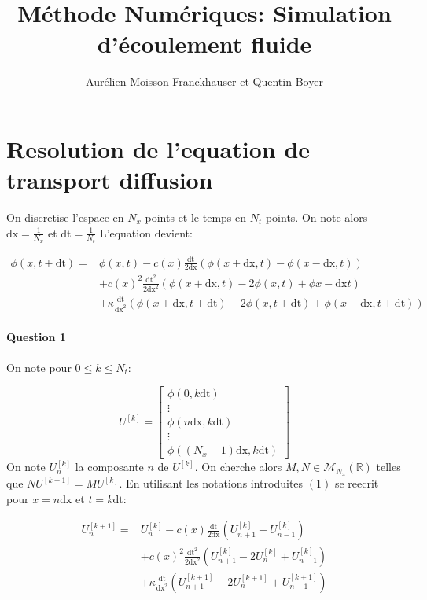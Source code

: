 \documentclass{article}
\newcommand{\dx}{\mathrm{dx}}
\newcommand{\dt}{\mathrm{dt}}
\begin{document}
\title{Méthode Numériques: Simulation d'écoulement fluide}
\author{Aurélien Moisson-Franckhauser et Quentin Boyer}
\maketitle

\section{Resolution de l'equation de transport diffusion}

On discretise l'espace en $N_x$ points et le temps en $N_t$ points. On note alors $\mathrm{dx}=\frac{1}{N_x}$ et $\mathrm{dt}=\frac{1}{N_t}$
L'equation devient:


\begin{equation}
	\begin{aligned}
	\phi(x,t+\dt) ={} & \phi(x,t)-c(x)\frac{\dt}{2\dx}(\phi(x+\dx, t)-\phi(x-\dx,t)) \\
					&+c{(x)}^2\frac{\dt^{2}}{2\dx^{2}}(\phi(x+\dx,t)-2\phi(x, t)+\phi{x-\dx}{t}) \\
					&+\kappa\frac{\dt}{\dx^2}(\phi(x+\dx,t+\dt)-2\phi(x,t+\dt)+\phi(x-\dx,t+\dt))
	\end{aligned}
\end{equation}


\paragraph{Question 1}
On note pour $0 \leq k \le N_t$:

\[U^{[k]}=
\begin{bmatrix}
	\phi(0, k\dt) \\
	\vdots \\
	\phi(n\dx, k\dt) \\
	\vdots \\
	\phi((N_x-1)\dx, k\dt)
\end{bmatrix}
\]
On note $U_n^{[k]}$ la composante $n$ de $U^{[k]}$. On cherche alors $ M,N \in \mathcal{M}_{N_x}(\mathbb{R})$ telles que $NU^{[k+1]}=MU^{[k]}$.
En utilisant les notations introduites $(1)$ se reecrit pour $x=n\dx$ et $t=k\dt$:

\[
	\begin{aligned}
		U^{[k+1]}_n ={} & U_n^{[k]} - c(x)\frac{\dt}{2\dx}(U_{n+1}^{[k]}-U_{n-1}^{[k]}) \\
					    & +c{(x)}^2\frac{\dt^{2}}{2\dx^{2}}(U_{n+1}^{[k]}-2U_{n}^{[k]}+U_{n-1}^{[k]}) \\
						& +\kappa\frac{\dt}{\dx^2}(U_{n+1}^{[k+1]}-2U_{n}^{[k+1]}+U_{n-1}^{[k+1]})
	\end{aligned}
\]
\end{document}
